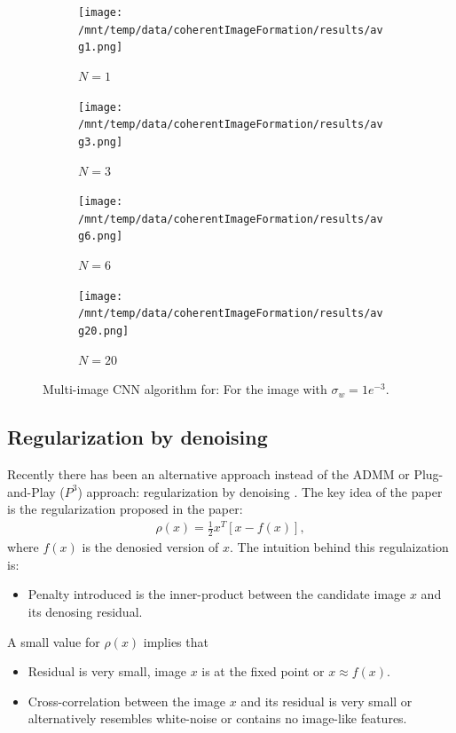 \documentclass[a4paper, 11pt]{article}
\begin{document}
\begin{figure}[!h]
\centering
\begin{subfigure}[b]{0.22\textwidth}
        \texttt{[image: /mnt/temp/data/coherentImageFormation/results/avg1.png]}
        \caption{$N = 1$}
        \label{fig:avg1}
    \end{subfigure}
    \begin{subfigure}[b]{0.22\textwidth}
        \texttt{[image: /mnt/temp/data/coherentImageFormation/results/avg3.png]}
        \caption{$N = 3$}
        \label{fig:avg3}
    \end{subfigure}
    \begin{subfigure}[b]{0.22\textwidth}
        \texttt{[image: /mnt/temp/data/coherentImageFormation/results/avg6.png]}
        \caption{$N = 6$}
        \label{fig:avg6}
    \end{subfigure}
    \begin{subfigure}[b]{0.22\textwidth}
        \texttt{[image: /mnt/temp/data/coherentImageFormation/results/avg20.png]}
        \caption{$N = 20$}
        \label{fig:avg20}
    \end{subfigure}
\caption{Multi-image CNN algorithm for: For the image with $\sigma_w=1e^{-3}$.}
\label{fig:avgFig}
\end{figure}
\clearpage 
\newpage 
\subsection{Regularization by denoising}
Recently there has been an alternative approach instead of the ADMM or Plug-and-Play ($P^3$) approach: regularization by denoising \cite{RED}. The key idea of the paper is the regularization proposed in the paper:
\begin{eqnarray*}
\rho(x)=\frac{1}{2}x^T[x-f(x)],  
\end{eqnarray*}
where $f(x)$ is the denosied version of $x$. The intuition behind this regulaization is:
\begin{itemize}
\item Penalty introduced is the inner-product between the candidate image $x$ and its denosing residual. 
\end{itemize}
A small value for $\rho(x)$ implies that 
\begin{itemize}
\item Residual is very small, image $x$ is at the fixed point or $x\approx f(x)$. 
\item Cross-correlation between the image $x$ and its residual is very small or alternatively resembles white-noise or contains no image-like features. 
\end{itemize}
\end{document}
